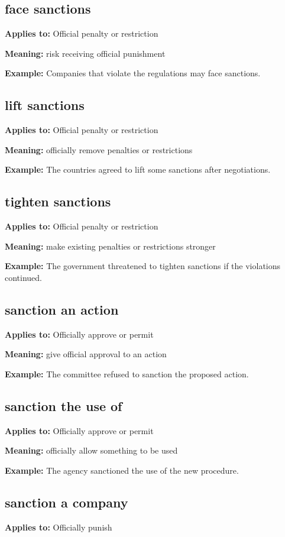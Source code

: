 \documentclass[11pt]{article}
\begin{document}
\subsection{face sanctions}
\textbf{Applies to:} Official penalty or restriction

\textbf{Meaning:} risk receiving official punishment

\textbf{Example:} Companies that violate the regulations may face sanctions.

\subsection{lift sanctions}
\textbf{Applies to:} Official penalty or restriction

\textbf{Meaning:} officially remove penalties or restrictions

\textbf{Example:} The countries agreed to lift some sanctions after negotiations.

\subsection{tighten sanctions}
\textbf{Applies to:} Official penalty or restriction

\textbf{Meaning:} make existing penalties or restrictions stronger

\textbf{Example:} The government threatened to tighten sanctions if the violations continued.

\subsection{sanction an action}
\textbf{Applies to:} Officially approve or permit

\textbf{Meaning:} give official approval to an action

\textbf{Example:} The committee refused to sanction the proposed action.

\subsection{sanction the use of}
\textbf{Applies to:} Officially approve or permit

\textbf{Meaning:} officially allow something to be used

\textbf{Example:} The agency sanctioned the use of the new procedure.

\subsection{sanction a company}
\textbf{Applies to:} Officially punish
\end{document}
